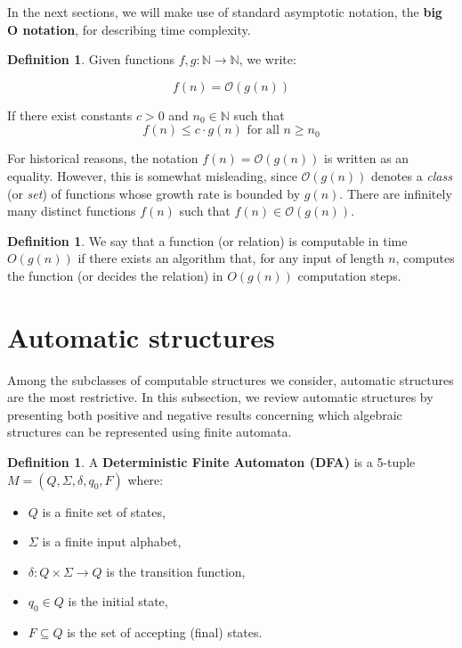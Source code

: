 \documentclass{pracalicmgr2025}
\theoremstyle{plain}            %
\theoremstyle{remark}           %
\theoremstyle{definition}       %
\newtheorem{definition}[theorem]{Definition}
\begin{document}
In the next sections, we will make use of standard asymptotic notation, the \textbf{big O notation}, for describing time complexity.
\begin{definition}
    Given functions $f, g: \mathbb{N} \to \mathbb{N}$, we write:
    
    $$f(n) = \mathcal{O}(g(n))$$
    
    If there exist constants $c > 0$ and $n_0 \in \mathbb{N}$ such that 
    $$f(n) \leq c \cdot g(n) \text{ for all } n \geq n_0$$
    
\end{definition}
For historical reasons, the notation $f(n) = \mathcal{O}(g(n))$ is written as an equality. However, this is somewhat misleading, since $\mathcal{O}(g(n))$ denotes a \emph{class} (or \emph{set}) of functions whose growth rate is bounded by $g(n)$. There are infinitely many distinct functions $f(n)$ such that $f(n) \in \mathcal{O}(g(n))$.

\begin{definition}
    We say that a function (or relation) is computable in time $O(g(n))$ if there exists an algorithm that, for any input of length $n$, computes the function (or decides the relation) in $O(g(n))$ computation steps.
\end{definition}

\section{Automatic structures} \label{automatic structures}

Among the subclasses of computable structures we consider, automatic structures are the most restrictive. In this subsection, we review automatic structures by presenting both positive and negative results concerning which algebraic structures can be represented using finite automata.


\begin{definition}  
    \cite{hopcroft2001introduction} A \textbf{Deterministic Finite Automaton (DFA)} is a 5-tuple $M = (Q, \Sigma, \delta, q_0, F)$ where:
    \begin{itemize}
        \item $Q$ is a finite set of states,
        \item $\Sigma$ is a finite input alphabet,
        \item $\delta: Q \times \Sigma \to Q$ is the transition function,
        \item $q_0 \in Q$ is the initial state,
        \item $F \subseteq Q$ is the set of accepting (final) states.
    \end{itemize}
\end{definition}
\end{document}

